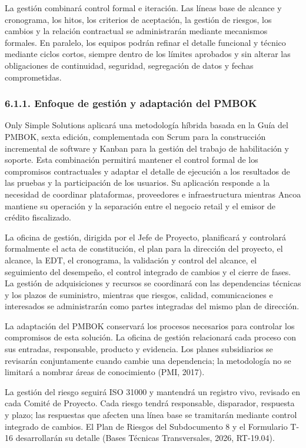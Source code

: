\documentclass[11pt]{article}
\begin{document}
La gestión combinará control formal e iteración. Las líneas base de
alcance y cronograma, los hitos, los criterios de aceptación, la gestión
de riesgos, los cambios y la relación contractual se administrarán
mediante mecanismos formales. En paralelo, los equipos podrán refinar el
detalle funcional y técnico mediante ciclos cortos, siempre dentro de
los límites aprobados y sin alterar las obligaciones de continuidad,
seguridad, segregación de datos y fechas comprometidas.

\subsubsection{6.1.1. Enfoque de gestión y adaptación del PMBOK}\label{6-1-1-enfoque-de-gestion-y-adaptacion-del-pmbok}

Only Simple Solutions aplicará una metodología híbrida basada en la Guía del PMBOK, sexta edición, complementada con Scrum para la construcción incremental de software y Kanban para la gestión del trabajo de habilitación y soporte. Esta combinación permitirá mantener el control formal de los compromisos contractuales y adaptar el detalle de ejecución a los resultados de las pruebas y la participación de los usuarios. Su aplicación responde a la necesidad de coordinar plataformas, proveedores e infraestructura mientras Ancoa mantiene su operación y la separación entre el negocio retail y el emisor de crédito fiscalizado.

La oficina de gestión, dirigida por el Jefe de Proyecto, planificará y
controlará formalmente el acta de constitución, el plan para la
dirección del proyecto, el alcance, la EDT, el cronograma, la validación
y control del alcance, el seguimiento del desempeño, el control
integrado de cambios y el cierre de fases. La gestión de adquisiciones y
recursos se coordinará con las dependencias técnicas y los plazos de
suministro, mientras que riesgos, calidad, comunicaciones e interesados
se administrarán como partes integradas del mismo plan de dirección.

La adaptación del PMBOK conservará los procesos necesarios para
controlar los compromisos de esta solución. La oficina de gestión
relacionará cada proceso con sus entradas, responsable, producto y
evidencia. Los planes subsidiarios se revisarán conjuntamente cuando
cambie una dependencia; la metodología no se limitará a nombrar áreas de
conocimiento (PMI, 2017).

La gestión del riesgo seguirá ISO 31000 y mantendrá un registro vivo,
revisado en cada Comité de Proyecto. Cada riesgo tendrá responsable,
disparador, respuesta y plazo; las respuestas que afecten una línea base
se tramitarán mediante control integrado de cambios. El Plan de Riesgos
del Subdocumento 8 y el Formulario T-16 desarrollarán su detalle (Bases
Técnicas Transversales, 2026, RT-19.04).
\end{document}
